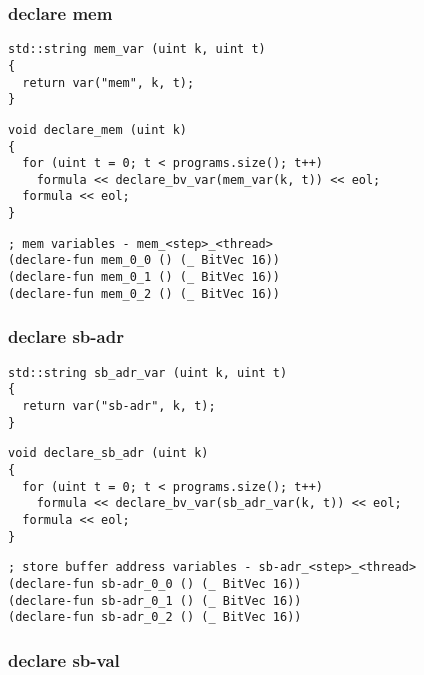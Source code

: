 \subsubsection{declare mem}

\begin{lstlisting}[style=c++]
std::string mem_var (uint k, uint t)
{
  return var("mem", k, t);
}
\end{lstlisting}

\begin{lstlisting}[style=c++]
void declare_mem (uint k)
{
  for (uint t = 0; t < programs.size(); t++)
    formula << declare_bv_var(mem_var(k, t)) << eol;
  formula << eol;
}
\end{lstlisting}

\begin{lstlisting}[language=SMTLib]
; mem variables - mem_<step>_<thread>
(declare-fun mem_0_0 () (_ BitVec 16))
(declare-fun mem_0_1 () (_ BitVec 16))
(declare-fun mem_0_2 () (_ BitVec 16))
\end{lstlisting}

\subsubsection{declare sb-adr}

\begin{lstlisting}[style=c++]
std::string sb_adr_var (uint k, uint t)
{
  return var("sb-adr", k, t);
}
\end{lstlisting}

\begin{lstlisting}[style=c++]
void declare_sb_adr (uint k)
{
  for (uint t = 0; t < programs.size(); t++)
    formula << declare_bv_var(sb_adr_var(k, t)) << eol;
  formula << eol;
}
\end{lstlisting}

\begin{lstlisting}[language=SMTLib]
; store buffer address variables - sb-adr_<step>_<thread>
(declare-fun sb-adr_0_0 () (_ BitVec 16))
(declare-fun sb-adr_0_1 () (_ BitVec 16))
(declare-fun sb-adr_0_2 () (_ BitVec 16))
\end{lstlisting}

\subsubsection{declare sb-val}

